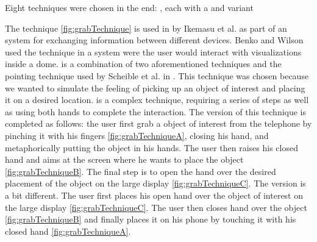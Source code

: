 Eight techniques were chosen in the end: \alltechniques, each with a \push and \pull variant

The \grab technique \cref{fig:grabTechnique} is used in  by Ikemasu et al. as part of an system for exchanging information between different devices. Benko and Wilson  used the \grab technique in a system were the user would interact with visualizations inside a dome. \grab is a combination of two aforementioned techniques and the pointing technique used by Scheible et al. in .
This technique was chosen because we wanted to simulate the feeling of picking up an object of interest and placing it on a desired location.
\grab is a complex technique, requiring a series of steps as well as using both hands to complete the interaction.
The \push version of this technique is completed as follows: the user first grab a object of interest from the telephone by pinching it with his fingers \cref{fig:grabTechniqueA}, closing his hand, and metaphorically putting the object in his hands.
The user then raises his closed hand and aims at the screen where he wants to place the object \cref{fig:grabTechniqueB}.
The final step is to open the hand over the desired placement of the object on the large display \cref{fig:grabTechniqueC}.
The \pull version is a bit different.
The user first places his open hand over the object of interest on the large display \cref{fig:grabTechniqueC}.
The user then closes hand over the object \cref{fig:grabTechniqueB} and finally places it on his phone by touching it with his closed hand \cref{fig:grabTechniqueA}.  

